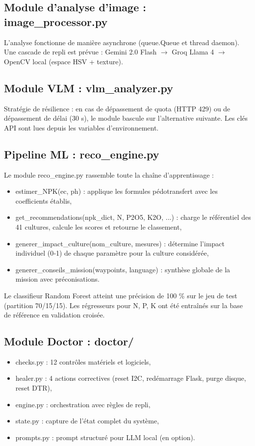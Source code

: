 \documentclass[a4paper,12pt,openany,titlepage]{scrartcl}
\begin{document}
\subsection{Module d’analyse d’image : image\_processor.py}
L’analyse fonctionne de manière asynchrone (queue.Queue et thread daemon). Une cascade de repli est prévue : Gemini 2.0 Flash $\rightarrow$ Groq Llama 4 $\rightarrow$ OpenCV local (espace HSV + texture).

\subsection{Module VLM : vlm\_analyzer.py}
Stratégie de résilience : en cas de dépassement de quota (HTTP 429) ou de dépassement de délai (30 s), le module bascule sur l’alternative suivante. Les clés API sont lues depuis les variables d’environnement.

\subsection{Pipeline ML : reco\_engine.py}
Le module reco\_engine.py rassemble toute la chaîne d’apprentissage :
\begin{itemize}[nosep]
    \item estimer\_NPK(ec, ph) : applique les formules pédotransfert avec les coefficients établis,
    \item get\_recommendations(npk\_dict, N, P2O5, K2O, ...) : charge le référentiel des 41 cultures, calcule les scores et retourne le classement,
    \item generer\_impact\_culture(nom\_culture, mesures) : détermine l’impact individuel (0‑1) de chaque paramètre pour la culture considérée,
    \item generer\_conseils\_mission(waypoints, language) : synthèse globale de la mission avec préconisations.
\end{itemize}

Le classifieur Random Forest atteint une précision de 100 \% sur le jeu de test (partition 70/15/15). Les régresseurs pour N, P, K ont été entraînés sur la base de référence en validation croisée.

\subsection{Module Doctor : doctor/}
\begin{itemize}[nosep]
    \item checks.py : 12 contrôles matériels et logiciels,
    \item healer.py : 4 actions correctives (reset I2C, redémarrage Flask, purge disque, reset DTR),
    \item engine.py : orchestration avec règles de repli,
    \item state.py : capture de l’état complet du système,
    \item prompts.py : prompt structuré pour LLM local (en option).
\end{itemize}
\end{document}
